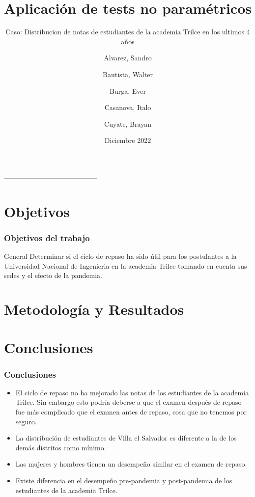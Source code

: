 \documentclass{beamer}
\title[PC3 Estadística Aplicada] %
{Aplicación de tests no paramétricos}
\subtitle{
  Caso: Distribucion de notas de estudiantes de la academia
    Trilce en los ultimos 4 años
}
\author %
{
  Alvarez, Sandro \and Bautista, Walter \\ \and Burga, Ever \and
    Casanova, Italo \and  Cuyate, Brayan
}
\institute
{
  Facultad de Ingenieria Industrial y de Sistemas\\
  Estadística Aplicada - PC2\\
  \textbf{Universidad Nacional de Ingenieria}
}
\date
{Diciembre 2022}
\begin{document}
\frame{\titlepage}

-----------------------------------------
\section{Objetivos}

\begin{frame}

\frametitle{Objetivos del trabajo}

\begin{alertblock}{General}
  Determinar si el ciclo de repaso ha sido útil para los postulantes a la
  Universidad Nacional de Ingenieria en la academia Trilce tomando en cuenta
  sus sedes y el efecto de la pandemia.
\end{alertblock}
\end{frame}


\section{Metodología y Resultados}














\section{Conclusiones}

\begin{frame}
  \frametitle{Conclusiones}
  \begin{itemize}
    \item El ciclo de repaso no ha mejorado las notas de los estudiantes de la academia Trilce. Sin embargo 
    esto podría deberse a que el examen después de repaso fue más complicado que el examen antes de repaso, cosa que no 
    tenemos por seguro. 
    \item La distribución de estudiantes de Villa el Salvador es diferente a la de los demás distritos como mínimo. 
    \item Las mujeres y hombres tienen un desempeño similar en el examen de repaso.
    \item Existe diferencia en el desempeño pre-pandemia y post-pandemia de los estudiantes de la academia Trilce.
  \end{itemize}
\end{frame}
\end{document}
